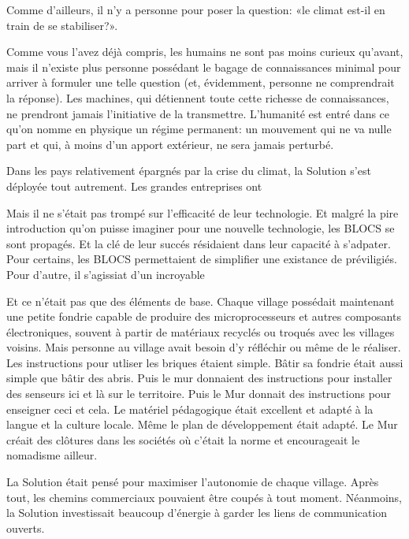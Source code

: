 

Comme d'ailleurs, il n'y a personne pour poser la question: «le climat est-il en train de se stabiliser?». 

Comme vous l'avez déjà compris, les humains ne sont pas moins curieux qu'avant,
mais il n'existe plus personne possédant le bagage de connaissances minimal
pour arriver à formuler une telle question (et, évidemment, personne ne
comprendrait la réponse).  Les machines, qui détiennent toute cette richesse de
connaissances, ne prendront jamais l'initiative de la transmettre. L'humanité
est entré dans ce qu'on nomme en physique un régime permanent: un mouvement qui
ne va nulle part et qui, à moins d'un apport extérieur, ne sera jamais
perturbé.


    Dans les pays relativement épargnés par la crise du climat, 
    la Solution s'est déployée tout autrement.
    Les grandes entreprises ont
    

    Mais il ne s'était pas trompé sur l'efficacité de leur technologie.  Et
    malgré la pire introduction qu'on puisse imaginer pour une nouvelle
    technologie, les BLOCS se sont propagés.  Et la clé de leur succés
    résidaient dans leur capacité à s'adpater.  Pour certains, les BLOCS
    permettaient de simplifier une existance de préviligiés.  Pour d'autre, il
    s'agissiat d'un incroyable 


    Et ce n'était pas que des éléments de base. Chaque village possédait
    maintenant une petite fondrie capable de produire des microprocesseurs et
    autres composants électroniques, souvent à partir de matériaux recyclés ou
    troqués avec les villages voisins. Mais personne au village avait besoin
    d'y réfléchir ou même de le réaliser. Les instructions pour utliser les
    briques étaient simple. Bâtir sa fondrie était aussi simple que bâtir
    des abris. Puis le mur donnaient des instructions pour installer
    des senseurs ici et là sur le territoire. Puis le Mur donnait des
    instructions pour enseigner ceci et cela. Le matériel pédagogique était
    excellent et adapté à la langue et la culture locale.  Même le plan de
    développement était adapté.  Le Mur créait des clôtures dans les sociétés
    où c'était la norme et encourageait le nomadisme ailleur.

    La Solution était pensé pour maximiser l'autonomie de chaque village. 
    Après tout, les chemins commerciaux pouvaient être coupés à tout moment.
    Néanmoins, la Solution investissait beaucoup d'énergie à garder les liens
    de communication ouverts.

